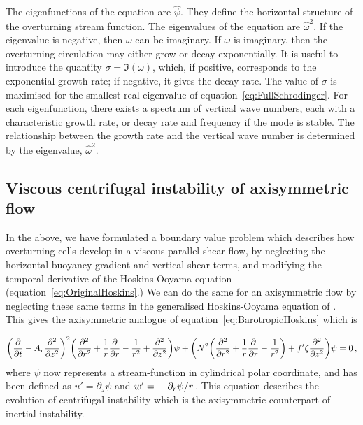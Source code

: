The eigenfunctions of the equation are $\hat{\psi}$. They define the horizontal structure of the overturning stream function. The eigenvalues of the equation are $\hat{\omega}^2$. If the eigenvalue is negative, then $\omega$ can be imaginary. If $\omega$ is imaginary, then the overturning circulation may either grow or decay exponentially. It is useful to introduce the quantity $\sigma = \Im(\omega)$, which, if positive, corresponds to the exponential growth rate; if negative, it gives the decay rate. The value of $\sigma$ is maximised for the smallest real eigenvalue of equation~\ref{eq:FullSchrodinger}. For each eigenfunction, there exists a spectrum of vertical wave numbers, each with a characteristic growth rate, or decay rate and frequency if the mode is stable\footnotemark.
The relationship between the growth rate and the vertical wave number is determined by the eigenvalue, $\hat{\omega}^2$.

\subsection{Viscous centrifugal instability of axisymmetric flow}
In the above, we have formulated a boundary value problem which describes how overturning cells develop in a viscous parallel shear flow, by neglecting the horizontal buoyancy gradient and vertical shear terms, and modifying the temporal derivative of the Hoskins-Ooyama equation (equation~\ref{eq:OriginalHoskins}.) We can do the same for an axisymmetric flow by neglecting these same terms in the generalised Hoskins-Ooyama equation of \citet{Buckingham2021}. This gives the axisymmetric analogue of equation~\ref{eq:BarotropicHoskins} which is

\begin{equation}
    \label{eq:BarotropicBuckingham}
    \bigg(\pdv{}{t} - A_r \pdv[2]{}{z} \bigg)^2 \bigg(\pdv[2]{}{r} + \frac{1}{r}\pdv{}{r} - \frac{1}{r^2} + \pdv[2]{}{z} \bigg) \psi + \bigg( N^2 \bigg(\pdv[2]{}{r} + \frac{1}{r}\pdv{}{r} - \frac{1}{r^2}\bigg) + f' \zeta \pdv[2]{}{z} \bigg) \psi = 0 \, ,
\end{equation}
where $\psi$ now represents a stream-function in cylindrical polar coordinate, and has been defined as $u' = \partial_z \psi$ and $w' = - \flatfrac{\partial_r \psi}{r}$. This equation describes the evolution of centrifugal instability which is the axisymmetric counterpart of inertial instability.


